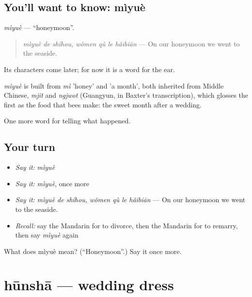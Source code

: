 \subsection*{You'll want to know: mìyuè}
\emph{mìyuè} — \textquotedblleft{}honeymoon\textquotedblright{}.

\begin{quote}
\emph{mìyuè de shíhou, wǒmen qù le hǎibiān} — On our honeymoon we went to the seaside.
\end{quote}

Its characters come later; for now it is a word for the ear.

\begin{cousinweb}
\emph{mìyuè} is built from \emph{mì} 'honey' and  'a month', both inherited from Middle Chinese, \emph{mjit} and \emph{ngjwot} (Guangyun, in Baxter's transcription), which glosses the first as the food that bees make: the sweet month after a wedding.
\end{cousinweb}

\begin{grammarlens}[title={What you've built}]
One more word for telling what happened.
\end{grammarlens}

\subsection*{Your turn}
\begin{itemize}
\raggedright
  \item \emph{Say it:} \emph{mìyuè}
  \item \emph{Say it:} \emph{mìyuè}, once more
  \item \emph{Say it:} \emph{mìyuè de shíhou, wǒmen qù le hǎibiān} — On our honeymoon we went to the seaside.
  \item \emph{Recall:} say the Mandarin for to divorce, then the Mandarin for to remarry, then say \emph{mìyuè} again
\end{itemize}

\begin{tcolorbox}[breakable,colback=teal!4,colframe=teal!35!black,title={Before you move on}]
What does mìyuè mean? (\textquotedblleft{}Honeymoon\textquotedblright{}.) Say it once more.
\end{tcolorbox}
\section[hūnshā]{hūnshā — wedding dress}

